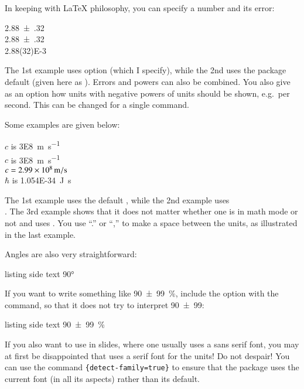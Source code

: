 In keeping with \LaTeX{} philosophy, you can specify a number and its
error:
\begin{tcblisting}{}
\num{2.88(32)}\\
\num[separate-uncertainty=false]{2.88(32)}\\
\num{2.88(32)E-3}
\end{tcblisting}
The 1st example uses  option
(which I specify), while the 2nd uses the package default
(given here as ).
Errors and powers can also be combined.
You also give as
an option how units with negative powers of units should be shown,
e.g.\ per second. This can be changed for a single command.

Some examples are given below:
\begin{tcblisting}{}
\(c\) is \qty{3E8}{\metre\per\second}\\
\(c\) is \qty[per-mode=fraction, fraction-function=\sfrac]{3E8}{\metre\per\second}\\
\(c = \qty[per-mode=symbol]{2.99E8}{\metre\per\second}\)\\
\(\hbar\) is \qty{1.054E-34}{\joule.\second}
\end{tcblisting}
\noindent
The 1st example uses the default ,
while the 2nd example uses\\
.
The 3rd example shows that it does not matter whether one is in math mode or not
and uses .
You use \enquote{.} or \enquote{,} to make a space between the units,
as illustrated in the last example.

Angles are also very straightforward:
\begin{tcblisting}{listing side text}
\ang{90}
\end{tcblisting}

If you want to write something like \qty[parse-numbers=false]{90(99)}{\%},
include the option  with the  command,
so that it does not try to interpret \num[parse-numbers=false]{90(99)}:
\begin{tcblisting}{listing side text}
\qty[parse-numbers=false]{90(99)}{\%}
\end{tcblisting}

If you also want to use  in slides, where one usually
uses a sans serif font, you may at first be disappointed that
 uses a serif font for the units! Do not despair!
You can use the command
\texttt{\{detect-family=true\}}
to ensure that the package uses the current font
(in all its aspects) rather than its default.

